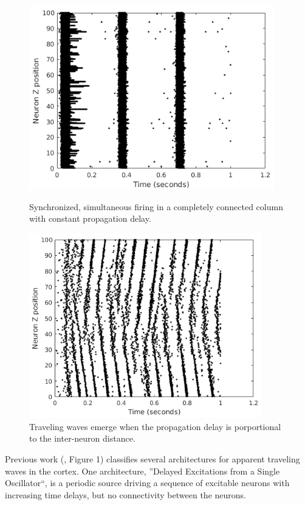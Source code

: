 \documentclass[a4paper,11pt]{article}
\begin{document}
\begin{figure}[!htb]
  \centering
  \begin{minipage}{0.45\textwidth}
      \centering
      \includegraphics[width=0.95\textwidth]{fig/IzzySync}
      \caption{Synchronized, simultaneous firing in a completely connected column with constant propagation delay.}
      \label{fig:sync_fire}
  \end{minipage}\hfill
  \begin{minipage}{0.45\textwidth}
      \centering
      \includegraphics[width=0.9\textwidth]{fig/IzzySync_Delay}
      \caption{Traveling waves emerge when the propagation delay is porportional to the inter-neuron distance. }
      \label{fig:sync_fire_delay}
  \end{minipage}
\end{figure}
Previous work (\cite{ermentrout2001}, Figure 1) classifies several architectures for apparent traveling waves in the cortex.
One architecture, ''Delayed Excitations from a Single Oscillator``, is a periodic source driving a sequence of excitable neurons with increasing time delays, but no connectivity between the neurons.
\end{document}
